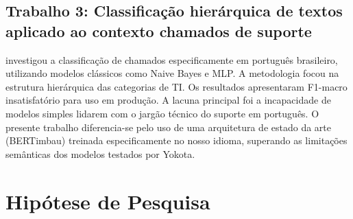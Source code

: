 \documentclass[
    12pt,                %
    openright,           %
    oneside,             %
    a4paper,             %
    english,             %
    brazil               %
]{abntex2}
\begin{document}
\subsection{Trabalho 3: Classificação hierárquica de textos aplicado ao contexto chamados de suporte}

 investigou a classificação de chamados especificamente em português brasileiro, utilizando modelos clássicos como Naive Bayes e MLP. A metodologia focou na estrutura hierárquica das categorias de TI. Os resultados apresentaram F1-macro insatisfatório para uso em produção. A lacuna principal foi a incapacidade de modelos simples lidarem com o jargão técnico do suporte em português. O presente trabalho diferencia-se pelo uso de uma arquitetura de estado da arte (BERTimbau) treinada especificamente no nosso idioma, superando as limitações semânticas dos modelos testados por Yokota.

\vspace{0.5cm}



\begin{table}[htb]
    \centering
    \caption{Comparação entre trabalhos relacionados}
    \label{tab:trabalhos_relacionados}
    \vspace{0.2cm}
\end{table}

\section{Hipótese de Pesquisa}
\label{sec:hipotese_pesquisa}
\end{document}
